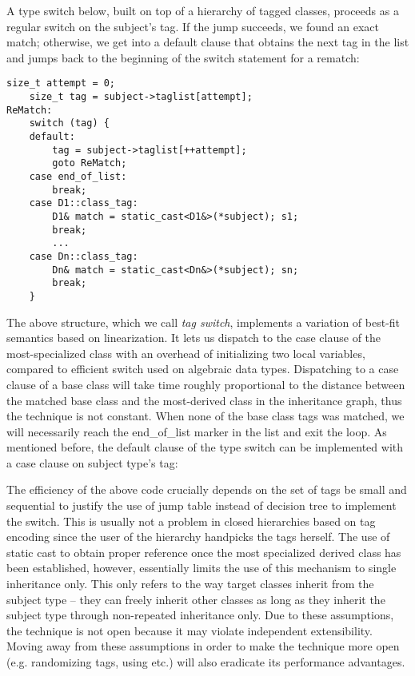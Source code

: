 A type switch below, built on top of a hierarchy of tagged classes, proceeds as 
a regular switch on the subject's tag. If the jump succeeds, we found an exact 
match; otherwise, we get into a default clause that obtains the next tag in the
list and jumps back to the beginning of the switch statement for a rematch:

\begin{lstlisting}[keepspaces]
    size_t attempt = 0; 
    size_t tag = subject->taglist[attempt];
ReMatch:
    switch (tag) {
    default:
        tag = subject->taglist[++attempt];
        goto ReMatch;
    case end_of_list: 
        break;
    case D1::class_tag: 
        D1& match = static_cast<D1&>(*subject); s1;
        break;
        ...
    case Dn::class_tag: 
        Dn& match = static_cast<Dn&>(*subject); sn;
        break;
    }
\end{lstlisting}

\noindent
The above structure, which we call \emph{tag switch}, implements a variation of 
best-fit semantics based on linearization. It lets us dispatch to the case 
clause of the most-specialized class with an overhead of initializing two 
local variables, compared to efficient switch used on algebraic data types. 
Dispatching to a case clause of a base class will take time roughly proportional 
to the distance between the matched base class and the most-derived class in the 
inheritance graph, thus the technique is not constant. When none of the base 
class tags was matched, we will necessarily reach the end\_of\_list marker in 
the list and exit the loop. As mentioned before, the default 
clause of the type switch can be implemented with a case clause on subject 
type's tag: 

The efficiency of the above code crucially depends on the set of tags 
be small and sequential to justify the use of jump table instead of 
decision tree to implement the switch. This is usually not a problem in closed 
hierarchies based on tag encoding since the user of the hierarchy handpicks 
the tags herself. The use of static cast to obtain proper reference once the most 
specialized derived class has been established, however, essentially limits the use of 
this mechanism to single inheritance only. This only refers to the way target 
classes inherit from the subject type -- they can freely inherit other classes 
as long as they inherit the subject type through non-repeated inheritance only. 
Due to these assumptions, the technique is not open because it may  
violate independent extensibility. Moving away from these assumptions in order 
to make the technique more open (e.g. randomizing tags, using 
 etc.) will also eradicate its performance advantages.